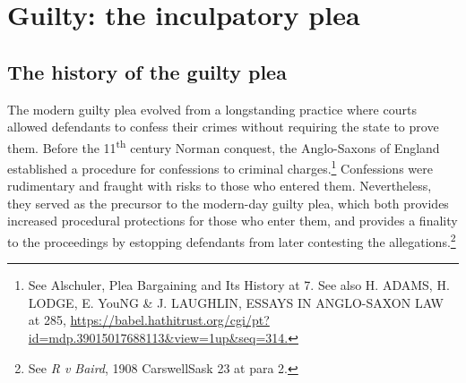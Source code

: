 \section{Guilty: the inculpatory plea}

\subsection{The history of the guilty plea}

The modern guilty plea evolved from a longstanding practice where courts allowed defendants to confess their crimes without requiring the state to prove them. Before the 11\textsuperscript{th} century Norman conquest, the Anglo-Saxons of England established a procedure for confessions to criminal charges.\footnote{See Alschuler, Plea Bargaining and Its History at 7. See also H. ADAMS, H. LODGE, E. YouNG \& J. LAUGHLIN, ESSAYS IN ANGLO-SAXON LAW at 285, \url{https://babel.hathitrust.org/cgi/pt?id=mdp.39015017688113\&view=1up\&seq=314.}} Confessions were rudimentary and fraught with risks to those who entered them. Nevertheless, they served as the precursor to the modern-day guilty plea, which both provides increased procedural protections for those who enter them, and provides a finality to the proceedings by estopping defendants from later contesting the allegations.\footnote{See \textit{R v Baird}, 1908 CarswellSask 23 at para 2.}

